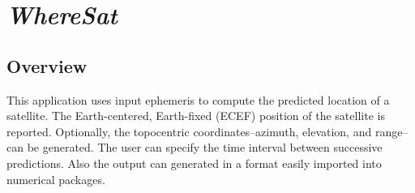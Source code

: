 %
%

\section{\emph{WhereSat}}
\subsection{Overview}
This application uses input ephemeris to compute the predicted location of a 
satellite. The Earth-centered, Earth-fixed (ECEF) position of the satellite is 
reported. Optionally, the topocentric coordinates--azimuth, elevation, and 
range--can be generated. The user can specify the time interval between 
successive predictions. Also the output can generated in a format easily
imported into numerical packages.

